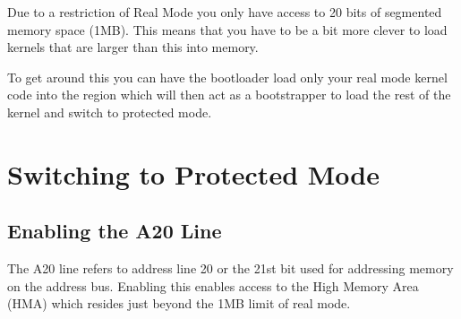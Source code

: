Due to a restriction of Real Mode you only have access to 20 bits of segmented
memory space (1MB). This means that you have to be a bit more clever to load
kernels that are larger than this into memory.

To get around this you can have the bootloader load only your real mode kernel
code into the region which will then act as a bootstrapper to load the rest of
the kernel and switch to protected mode.

\section{Switching to Protected Mode}

\subsection{Enabling the A20 Line}

The A20 line refers to address line 20 or the 21st bit used for addressing
memory on the address bus. Enabling this enables access to the High Memory Area
(HMA) which resides just beyond the 1MB limit of real mode.
